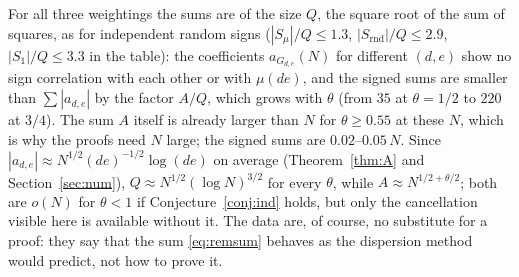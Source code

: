 ﻿\documentclass[11pt]{amsart}
\theoremstyle{remark}
\begin{document}
For all three weightings the sums are of the size $Q$, the square root of the sum of squares, as for independent random signs ($|S_\mu|/Q\le1.3$, $|S_{\mathrm{rnd}}|/Q\le2.9$, $|S_1|/Q\le3.3$ in the table): the coefficients $a_{G_{d,e}}(N)$ for different $(d,e)$ show no sign correlation with each other or with $\mu(de)$, and the signed sums are smaller than $\sum|a_{d,e}|$ by the factor $A/Q$, which grows with $\theta$ (from $35$ at $\theta=1/2$ to $220$ at $3/4$). The sum $A$ itself is already larger than $N$ for $\theta\ge0.55$ at these $N$, which is why the proofs need $N$ large; the signed sums are $0.02$--$0.05\,N$. Since $|a_{d,e}|\approx N^{1/2}(de)^{-1/2}\log(de)$ on average (Theorem~\ref{thm:A} and Section~\ref{sec:num}), $Q\approx N^{1/2}(\log N)^{3/2}$ for every $\theta$, while $A\approx N^{1/2+\theta/2}$; both are $o(N)$ for $\theta<1$ if Conjecture~\ref{conj:ind} holds, but only the cancellation visible here is available without it. The data are, of course, no substitute for a proof: they say that the sum \eqref{eq:remsum} behaves as the dispersion method would predict, not how to prove it.
\end{document}

